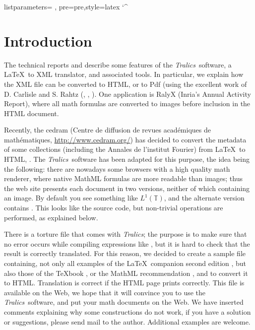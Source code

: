\documentclass[reqno]{report} %
\newcommand\LTC[1]{\xbox{latexcode}{#1}}
\newcommand\cmd[1]{\LTC{\textbackslash#1}}
\newcommand\Tralics{\textit{Tralics}}
\begin{document}
\makeRR

\def\mtext#1{\mathbox{mtext}{\mathcnothing{#1}}}
\def\BMS{\mathbox{mphantom}{~~\mathbox{mpadded}[width][0pt][height][20pt]{(}}}
\def\UnimplementedOperator#1{\mathbox{mstyle}[color][red]{\string#1}}
\def\not{\UnimplementedOperator\not}


{listparameters={ }, pre=pre,style=latex}
\chardef\HAT`\^
\chapter{Introduction}

The technical reports \cite{Tralics1} and \cite{Tralics2} describe
some features of the \Tralics\ software, a \LaTeX\ to XML translator,
and associated tools. In particular, we explain how the XML file 
can be converted
to HTML, or to Pdf (using the excellent work of D. Carlisle 
and S. Rahtz (\cite{Passive-tex}, \cite{CGR2000}, \cite{xmltex}).
One application is RalyX (Inria's Annual Activity Report), where all math
formulas are converted to images before inclusion in the HTML document.

Recently, the cedram (Centre de diffusion de revues acad\'emiques de
math\'ematiques, \href{http://www.cedram.org/}{http://www.cedram.org/}) 
has decided to convert the metadata of some collections (including the
Annales de l'institut Fourier) from \LaTeX\ to HTML, \cite{Bouche}. The
\Tralics\ software has been adapted for this purpose, the idea being the
following: there are nowadays some browsers with a high quality math
renderer, where native MathML formulas are more readable than images;
thus the web site presents each document in two versions, neither of which 
containing an image. By default you see something like 
$L^1(\mathbb{T})$, and the alternate version contains
\LTC{\$L\char`\^1(\textbackslash mathbb\{T\})\$}. This looks like the source
code, but non-trivial operations are performed, as explained below.

There is a torture file that comes with \Tralics; the purpose is to make sure
that no error occurs while compiling expressions like \cmd{cfrac12}, but it is
hard to check that the result is correctly translated. For this reason, we
decided to create a sample file containing, not only all examples of the
\LaTeX\ companion second edition \cite{companion2}, but also those of the
\TeX book \cite{texbook}, or the MathML recommendation \cite{mathml2},
 and to convert it to HTML. 
Translation is correct if the HTML page prints correctly. This file is
available on the Web, we hope that it will convince you to use the \Tralics\
software, and put your math documents on the Web. We have inserted comments
explaining why some constructions do not work, if you have a solution or
suggestions, please send mail to the author. Additional examples are welcome.
\end{document}
